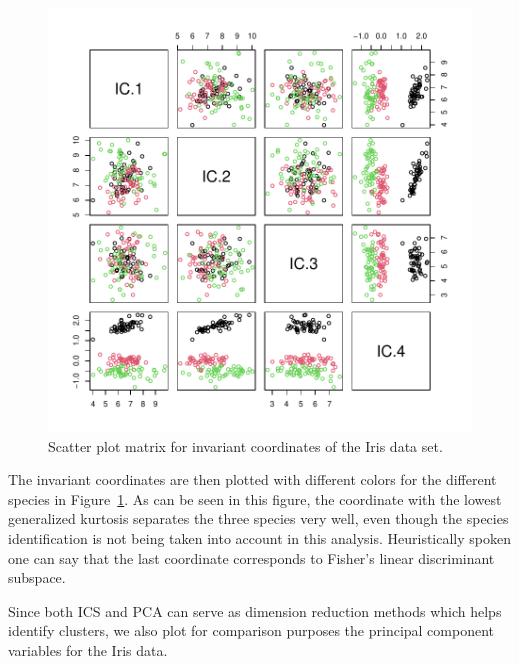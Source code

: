\documentclass[article,nojss]{jss}
\begin{document}
\begin{figure}[t]
\begin{center}
\includegraphics{ICS-015}
\caption{Scatter plot matrix for invariant coordinates of the Iris data set.}
\label{IrisICS}
\end{center}
\end{figure}

The invariant coordinates are then plotted with different colors for the different species in Figure~\ref{IrisICS}.
As can be seen in this figure, the coordinate with the lowest generalized kurtosis separates the three species very
well, even though the species identification is not being taken into account in this analysis. Heuristically spoken one can say that the last
coordinate corresponds to Fisher's linear discriminant subspace.



Since both {ICS} and {PCA} can serve as dimension reduction methods which helps
identify clusters, we also plot for comparison purposes the principal component variables for the Iris data.
\begin{Schunk}
\end{Schunk}
\end{document}
